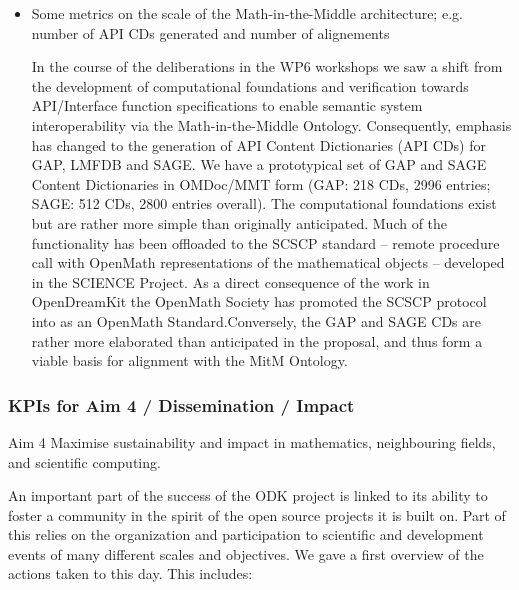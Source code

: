 \begin{enumerate}
\begin{itemize}
 \item Some metrics on the scale of the Math-in-the-Middle architecture; e.g. number of API CDs generated and number of alignements

In the course of the deliberations in the WP6 workshops we saw a shift from the development of computational foundations and verification towards API/Interface function specifications to enable semantic system interoperability via the Math-in-the-Middle Ontology. Consequently, emphasis has changed to the generation of API Content Dictionaries (API CDs) for GAP, LMFDB and SAGE. We have a prototypical set of GAP and SAGE Content Dictionaries in OMDoc/MMT form (GAP: 218 CDs, 2996 entries; SAGE: 512 CDs, 2800 entries overall). The computational foundations exist but are rather more simple than originally anticipated. Much of the functionality has been offloaded to the SCSCP standard – remote procedure call with OpenMath representations of the mathematical objects – developed in the SCIENCE Project. As a direct consequence of the work in OpenDreamKit the OpenMath Society has promoted the SCSCP protocol into as an OpenMath Standard.Conversely, the GAP and SAGE CDs are rather more elaborated than anticipated in the proposal, and thus form a viable basis for alignment with the MitM Ontology.

\end{itemize}
\end{enumerate}

\subsubsection{KPIs for Aim 4 / Dissemination / Impact}
\begin{recommendation}{Aim 4}
  Maximise sustainability and impact in mathematics, neighbouring fields, and scientific computing.
 \end{recommendation}

An important part of the success of the ODK project is linked to its ability to foster a community in the spirit of the open source projects 
it is built on. Part of this relies on the organization and participation to scientific and development events of many different scales and 
objectives. We gave a first overview of the actions taken to this day. This includes:

